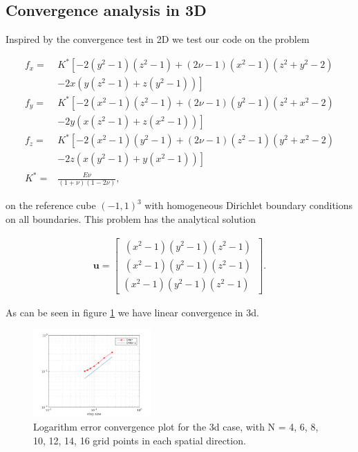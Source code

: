 

\subsection{Convergence analysis in 3D}

Inspired by the convergence test in 2D we test our code on the problem 

\begin{align}
f_x = &K^* \left[-2(y^2-1)(z^2-1) + (2 \nu -1)(x^2-1)(z^2 +y^2-2) \right.\nonumber\\
 &\left. -2x(y(z^2-1) + z(y^2-1)) \right] \\
 f_y = &K^* \left[-2(x^2-1)(z^2-1) + (2 \nu -1)(y^2-1)(z^2 +x^2-2) \right.\nonumber\\
 &\left. -2y(x(z^2-1) + z(x^2-1)) \right] \\
 f_z = &K^* \left[-2(x^2-1)(y^2-1) + (2 \nu -1)(z^2-1)(y^2 +x^2-2) \right.\nonumber\\
 &\left. -2z(x(y^2-1) + y(x^2-1)) \right] \\
 K^* = & \frac{E \nu}{(1+\nu)(1-2\nu)},
\end{align}


on the reference cube $(-1,1)^3$ with homogeneous Dirichlet boundary conditions on all boundaries. This problem has the analytical solution

\begin{align}
\bm{u} = \begin{bmatrix}
\, (x^2-1)(y^2-1)(z^2-1) \, \\
\, (x^2-1)(y^2-1)(z^2-1) \, \\
(x^2-1)(y^2-1)(z^2-1)
\end{bmatrix}.
\end{align}

As can be seen in figure \ref{fig:convergence3d} we have linear convergence in 3d.

\begin{figure}
\center
\includegraphics[width=0.4\textwidth]{convergence3d}
\caption{Logarithm error convergence plot for the 3d case, with N = 4, 6, 8, 10, 12, 14, 16 grid points in each spatial direction.}
\label{fig:convergence3d}
\end{figure}

